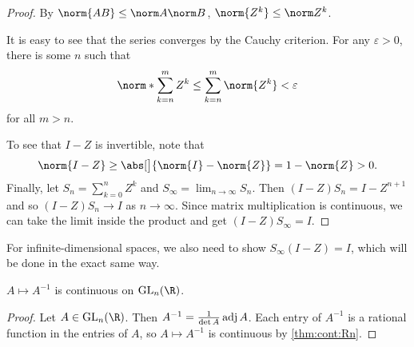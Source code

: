 \begin{proof}
    By $\norm{AB} \le \norm A \norm B$, $\norm{Z^k} \le \norm Z^k$.

    It is easy to see that the series converges by the Cauchy criterion.
    For any $\varepsilon > 0$, there is some $n$ such that \[
        \norm*{\sum_{k=n}^m Z^k} \le \sum_{k=n}^m \norm{Z^k} < \varepsilon
    \]
    for all $m > n$.

    To see that $I - Z$ is invertible, note that \[
        \norm{I - Z} \ge \abs[\big]{\norm{I} - \norm{Z}} = 1 - \norm{Z} > 0.
    \]
    Finally, let $S_n = \sum_{k=0}^n Z^k$ and
    $S_\infty = \lim_{n \to \infty} S_n$.
    Then $(I - Z)S_n = I - Z^{n+1}$ and so
    $(I - Z)S_n \to I$ as $n \to \infty$.
    Since matrix multiplication is continuous, we can take the limit
    inside the product and get $(I - Z)S_\infty = I$.
\end{proof}
\begin{remark}
    For infinite-dimensional spaces, we also need to show
    $S_\infty (I - Z) = I$, which will be done in the exact same way.
\end{remark}

\begin{proposition*} \label{thm:inv-cont}
    $A \mapsto A^{-1}$ is continuous on $\GL_n(\R)$.
\end{proposition*}
\begin{proof}
    Let $A \in \GL_n(\R)$.
    Then $A^{-1} = \frac1{\det A} \operatorname{adj} A$.
    Each entry of $A^{-1}$ is a rational function in the entries of $A$,
    so $A \mapsto A^{-1}$ is continuous by \cref{thm:cont:Rn}.
\end{proof}
